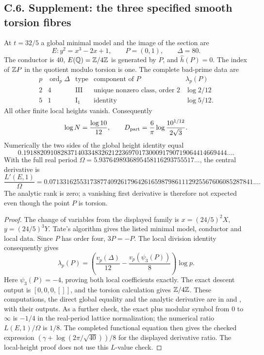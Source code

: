 \subsection{C.6. Supplement: the three specified smooth torsion fibres}

\begin{statement}
At $t=32/5$ a global minimal model and the image of the section are
\[
 E:y^2=x^3-2x+1,\qquad P=(0,1),\qquad \Delta=80.
\]
The conductor is $40$, $E(\mathbb Q)=\mathbb Z/4\mathbb Z$ is generated by $P$,
and $\widehat h(P)=0$. The index of $\mathbb Z P$ in the quotient
modulo torsion is one. The complete bad-prime data are
\[
\begin{array}{c|c|c|c|c}
p&\operatorname{ord}_p\Delta&\text{type}&\text{component of }P&\lambda_p(P)\\\hline
2&4&\mathrm{III}&\text{unique nonzero class, order }2&\log2/12\\
5&1&\mathrm I_1&\text{identity}&\log5/12.
\end{array}
\]
All other finite local heights vanish. Consequently
\[
 \log N=\frac{\log10}{12},\qquad
 D_{\rm part}=\frac6\pi\log\frac{10^{1/12}}{2\sqrt3}.
\]
Numerically the two sides of the global height identity equal
\[
 0.191882091082837140334832621223697017300091790719064414669444\ldots.
\]
With the full real period $\Omega=5.9376498936895458116293755517\ldots$,
the central derivative is
\[
 \frac{L'(E,1)}\Omega=
 0.071331625531738774092617964261659879861112925567606085287841\ldots.
\]
The analytic rank is zero; a vanishing first derivative is therefore
not expected even though the point $P$ is torsion.
\end{statement}
\begin{proof}
The change of variables from the displayed family is
$x=(24/5)^2X$, $y=(24/5)^3Y$. Tate's algorithm gives the
listed minimal model, conductor and local data. Since $P$ has
order four, $3P=-P$. The local division identity consequently
gives
\[
 \lambda_p(P)=\left(\frac{v_p(\Delta)}{12}
                         -\frac{v_p(\psi_3(P))}{8}\right)\log p.
\]
Here $\psi_3(P)=-4$, proving both local coefficients exactly.
The exact descent output is $[0,0,0,[]]$, and the torsion
calculation gives $\mathbb Z/4\mathbb Z$. These computations, the direct
global equality and the analytic derivative are in
 and
, with their outputs.
As a further check, the exact plus modular symbol from $0$ to
$\infty$ is $-1/4$ in the real-period lattice normalization;
the numerical ratio $L(E,1)/\Omega$ is $1/8$. The completed
functional equation then gives the checked expression
$(\gamma+\log(2\pi/\sqrt{40}))/8$ for the displayed derivative
ratio. The local-height proof does not use this $L$-value check.
\end{proof}

